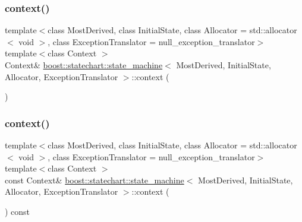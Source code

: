 \mbox{\label{classboost_1_1statechart_1_1state__machine_a05dc556eca3931ddd2afb6bec54973ae}} 
\subsubsection{\texorpdfstring{context()}{context()}\hspace{0.1cm}{\footnotesize\ttfamily [1/2]}}
{\footnotesize\ttfamily template$<$class Most\+Derived, class Initial\+State, class Allocator = std\+::allocator$<$ void $>$, class Exception\+Translator = null\+\_\+exception\+\_\+translator$>$ \\
template$<$class Context $>$ \\
Context\& \mbox{\hyperlink{classboost_1_1statechart_1_1state__machine}{boost\+::statechart\+::state\+\_\+machine}}$<$ Most\+Derived, Initial\+State, Allocator, Exception\+Translator $>$\+::context (\begin{DoxyParamCaption}{ }\end{DoxyParamCaption})\hspace{0.3cm}{\ttfamily [inline]}}

\mbox{\label{classboost_1_1statechart_1_1state__machine_a0f5270e37c35f915c724b702044b8902}} 
\subsubsection{\texorpdfstring{context()}{context()}\hspace{0.1cm}{\footnotesize\ttfamily [2/2]}}
{\footnotesize\ttfamily template$<$class Most\+Derived, class Initial\+State, class Allocator = std\+::allocator$<$ void $>$, class Exception\+Translator = null\+\_\+exception\+\_\+translator$>$ \\
template$<$class Context $>$ \\
const Context\& \mbox{\hyperlink{classboost_1_1statechart_1_1state__machine}{boost\+::statechart\+::state\+\_\+machine}}$<$ Most\+Derived, Initial\+State, Allocator, Exception\+Translator $>$\+::context (\begin{DoxyParamCaption}{ }\end{DoxyParamCaption}) const\hspace{0.3cm}{\ttfamily [inline]}}


